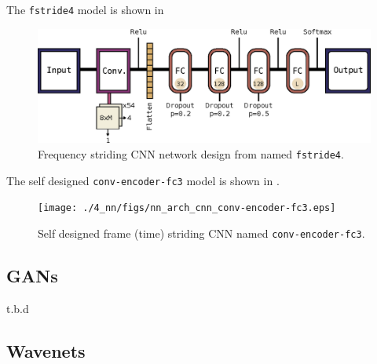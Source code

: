 The \texttt{fstride4} model is shown in 
\begin{figure}[!ht]
  \centering
    \includegraphics[height=0.2\textwidth]{./4_nn/figs/nn_arch_cnn_fstride.eps}
  \caption{Frequency striding CNN network design from \cite{Sainath2015} named \texttt{fstride4}.}
  \label{fig:nn_arch_cnn_fstride}
\end{figure}
\FloatBarrier
\noindent

The self designed \texttt{conv-encoder-fc3} model is shown in .
\begin{figure}[!ht]
  \centering
    \texttt{[image: ./4\_nn/figs/nn\_arch\_cnn\_conv-encoder-fc3.eps]}
  \caption{Self designed frame (time) striding CNN named \texttt{conv-encoder-fc3}.}
  \label{fig:nn_arch_cnn_conv-encoder-fc3}
\end{figure}
\FloatBarrier
\noindent



\subsection{GANs}\label{sec:nn_arch_gan}
t.b.d
%
%


\subsection{Wavenets}\label{sec:nn_arch_wavenet}

